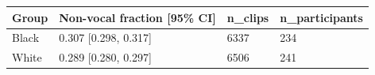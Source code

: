 \begin{tabular}{llll}
\toprule
Group & Non-vocal fraction [95\% CI] & n\_clips & n\_participants \\
\midrule
Black & 0.307 [0.298, 0.317] & 6337 & 234 \\
White & 0.289 [0.280, 0.297] & 6506 & 241 \\
\bottomrule
\end{tabular}
